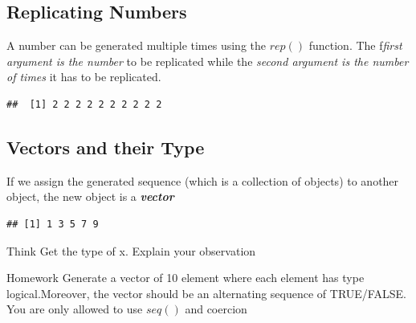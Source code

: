 \documentclass[12pt]{book}\usepackage{knitr}
\begin{document}
\subsection{Replicating Numbers}
A number can be generated multiple times using the $rep()$ function. The f\emph{first argument is the number} to be replicated while the \emph{second argument is the number of times} it has to be replicated.
\begin{knitrout}
\color{fgcolor}\begin{kframe}
\begin{alltt}
\hlstd{(}\hlstd{,}\hlstd{)} 
\end{alltt}
\begin{verbatim}
##  [1] 2 2 2 2 2 2 2 2 2 2
\end{verbatim}
\end{kframe}
\end{knitrout}

\subsection{Vectors and their Type}
\noindent If we assign the generated sequence (which is a collection of objects) to another object, the new object is a \textbf{\emph{vector}}
\begin{knitrout}
\color{fgcolor}\begin{kframe}
\begin{alltt}
\hlkwb{<-}\hlstd{(}\hlstd{,}\hlstd{,}\hlstd{=}\hlstd{)} 
\end{alltt}
\begin{verbatim}
## [1] 1 3 5 7 9
\end{verbatim}
\end{kframe}
\end{knitrout}
\begin{DIY}{Think}
Get the type of x. Explain your observation
\end{DIY}

\begin{DIY}{Homework}
Generate a vector of 10 element where each element has type logical.Moreover, the vector should be an alternating sequence of TRUE/FALSE. You are only allowed to use $seq()$ and coercion
\end{DIY}
\end{document}
